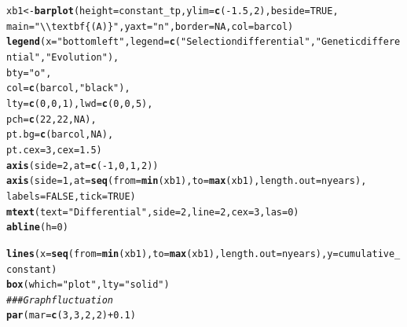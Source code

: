 \documentclass{article}\usepackage[]{graphicx}\usepackage[]{color}
\makeatletter
\newcommand{\hlnum}[1]{\textcolor[rgb]{0.686,0.059,0.569}{#1}}%
\newcommand{\hlstr}[1]{\textcolor[rgb]{0.192,0.494,0.8}{#1}}%
\newcommand{\hlcom}[1]{\textcolor[rgb]{0.678,0.584,0.686}{\textit{#1}}}%
\newcommand{\hlopt}[1]{\textcolor[rgb]{0,0,0}{#1}}%
\newcommand{\hlstd}[1]{\textcolor[rgb]{0.345,0.345,0.345}{#1}}%
\newcommand{\hlkwb}[1]{\textcolor[rgb]{0.69,0.353,0.396}{#1}}%
\newcommand{\hlkwc}[1]{\textcolor[rgb]{0.333,0.667,0.333}{#1}}%
\newcommand{\hlkwd}[1]{\textcolor[rgb]{0.737,0.353,0.396}{\textbf{#1}}}%
\newenvironment{kframe}{%
 \def\at@end@of@kframe{}%
 \ifinner\ifhmode%
  \def\at@end@of@kframe{\end{minipage}}%
  \begin{minipage}{\columnwidth}%
 \fi\fi%
 \def\FrameCommand##1{\hskip\@totalleftmargin \hskip-\fboxsep
 \colorbox{shadecolor}{##1}\hskip-\fboxsep
     \hskip-\linewidth \hskip-\@totalleftmargin \hskip\columnwidth}%
 \MakeFramed {\advance\hsize-\width
   \@totalleftmargin\z@ \linewidth\hsize
   \@setminipage}}%
 {\par\unskip\endMakeFramed%
 \at@end@of@kframe}
\newenvironment{knitrout}{}{} %
\makeatother
\begin{document}
\begin{knitrout}
\begin{kframe}
\begin{alltt}
\hlstd{xb1} \hlkwb{<-} \hlkwd{barplot}\hlstd{(}\hlkwc{height} \hlstd{= constant_tp,} \hlkwc{ylim} \hlstd{=} \hlkwd{c}\hlstd{(}\hlopt{-}\hlnum{1.5}\hlstd{,}\hlnum{2}\hlstd{),} \hlkwc{beside} \hlstd{=} \hlnum{TRUE}\hlstd{,}
               \hlkwc{main}\hlstd{=}\hlstr{"\textbackslash{}\textbackslash{}textbf\{(A)\}"}\hlstd{,} \hlkwc{yaxt}\hlstd{=}\hlstr{"n"}\hlstd{,} \hlkwc{border} \hlstd{=} \hlnum{NA}\hlstd{,} \hlkwc{col} \hlstd{= barcol )}
\hlkwd{legend}\hlstd{(}\hlkwc{x} \hlstd{=} \hlstr{"bottomleft"}\hlstd{,} \hlkwc{legend} \hlstd{=} \hlkwd{c}\hlstd{(}\hlstr{"Selection differential"}\hlstd{,} \hlstr{"Genetic differential"}\hlstd{,} \hlstr{"Evolution"}\hlstd{),}
              \hlkwc{bty} \hlstd{=} \hlstr{"o"}\hlstd{,}
       \hlkwc{col} \hlstd{=} \hlkwd{c}\hlstd{(barcol,}\hlstr{"black"}\hlstd{),}
       \hlkwc{lty} \hlstd{=} \hlkwd{c}\hlstd{(}\hlnum{0}\hlstd{,} \hlnum{0}\hlstd{,} \hlnum{1}\hlstd{),} \hlkwc{lwd} \hlstd{=} \hlkwd{c}\hlstd{(}\hlnum{0}\hlstd{,} \hlnum{0}\hlstd{,} \hlnum{5}\hlstd{),}
       \hlkwc{pch} \hlstd{=} \hlkwd{c}\hlstd{(}\hlnum{22}\hlstd{,} \hlnum{22}\hlstd{,} \hlnum{NA}\hlstd{),}
       \hlkwc{pt.bg} \hlstd{=} \hlkwd{c}\hlstd{(barcol,} \hlnum{NA}\hlstd{),}
       \hlkwc{pt.cex} \hlstd{=} \hlnum{3}\hlstd{,} \hlkwc{cex}\hlstd{=}\hlnum{1.5}\hlstd{)}
\hlkwd{axis}\hlstd{(}\hlkwc{side}\hlstd{=}\hlnum{2}\hlstd{,} \hlkwc{at} \hlstd{=} \hlkwd{c}\hlstd{(}\hlopt{-}\hlnum{1}\hlstd{,}\hlnum{0}\hlstd{,}\hlnum{1}\hlstd{,}\hlnum{2}\hlstd{))}
\hlkwd{axis}\hlstd{(}\hlkwc{side}\hlstd{=}\hlnum{1}\hlstd{,} \hlkwc{at} \hlstd{=} \hlkwd{seq}\hlstd{(}\hlkwc{from}\hlstd{=}\hlkwd{min}\hlstd{(xb1),} \hlkwc{to}\hlstd{=}\hlkwd{max}\hlstd{(xb1),} \hlkwc{length.out} \hlstd{= nyears),}
     \hlkwc{labels} \hlstd{=} \hlnum{FALSE}\hlstd{,}\hlkwc{tick} \hlstd{=} \hlnum{TRUE}\hlstd{)}
\hlkwd{mtext}\hlstd{(}\hlkwc{text} \hlstd{=} \hlstr{"Differential"}\hlstd{,} \hlkwc{side} \hlstd{=} \hlnum{2}\hlstd{,} \hlkwc{line} \hlstd{=} \hlnum{2}\hlstd{,} \hlkwc{cex}\hlstd{=}\hlnum{3}\hlstd{,} \hlkwc{las}\hlstd{=}\hlnum{0}\hlstd{)}
\hlkwd{abline}\hlstd{(}\hlkwc{h}\hlstd{=}\hlnum{0}\hlstd{)}

\hlkwd{lines}\hlstd{(}\hlkwc{x}\hlstd{=}\hlkwd{seq}\hlstd{(}\hlkwc{from}\hlstd{=}\hlkwd{min}\hlstd{(xb1),} \hlkwc{to}\hlstd{=}\hlkwd{max}\hlstd{(xb1),} \hlkwc{length.out} \hlstd{= nyears),} \hlkwc{y}\hlstd{=cumulative_constant)}
\hlkwd{box}\hlstd{(}\hlkwc{which} \hlstd{=} \hlstr{"plot"}\hlstd{,} \hlkwc{lty} \hlstd{=} \hlstr{"solid"}\hlstd{)}
\hlcom{### Graph fluctuation}
\hlkwd{par}\hlstd{(}\hlkwc{mar}\hlstd{=}\hlkwd{c}\hlstd{(}\hlnum{3}\hlstd{,} \hlnum{3}\hlstd{,} \hlnum{2}\hlstd{,} \hlnum{2}\hlstd{)} \hlopt{+} \hlnum{0.1}\hlstd{)}


\end{alltt}
\end{kframe}
\end{knitrout}
\end{document}
